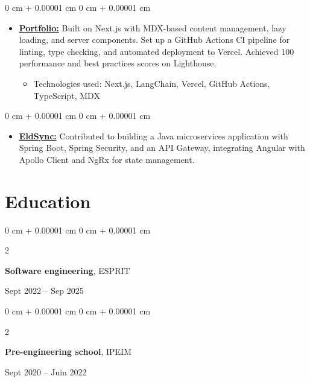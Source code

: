 \documentclass[10pt, letterpaper]{article}
\newenvironment{highlights}{
  \begin{itemize}[
    topsep=0.10 cm,
    parsep=0.10 cm,
    partopsep=0pt,
    itemsep=0pt,
    leftmargin=0 cm + 10pt
    ]
  }{
\end{itemize}
}
\newenvironment{highlightsforbulletentries}{
  \begin{itemize}[
    topsep=0 cm,
    parsep=0.10 cm,
    partopsep=0pt,
    itemsep=0pt,
    leftmargin=10pt
    ]
  }{
\end{itemize}
} %
\newenvironment{onecolentry}{
  \begin{adjustwidth}{
      0 cm + 0.00001 cm
    }{
      0 cm + 0.00001 cm
    }
  }{
  \end{adjustwidth}
} %
\newenvironment{twocolentry}[2][]{
  \onecolentry
  \def\secondColumn{#2}
  \setcolumnwidth{\fill, 4.5 cm}
  \begin{paracol}{2}
  }{
    \switchcolumn \raggedleft \secondColumn
  \end{paracol}
  \end{onecolentry}
} %
\begin{document}
\begin{onecolentry}
  \begin{highlights}
\item \textbf{\href{https://ihebbelhadj.vercel.app/}{Portfolio:}} Built on Next.js with MDX-based content management, lazy loading, and server components. Set up a GitHub Actions CI pipeline for linting, type checking, and automated deployment to Vercel. Achieved 100 performance and best practices scores on Lighthouse.
    \begin{highlightsforbulletentries}
    \item Technologies used: Next.js, LangChain, Vercel, GitHub Actions, TypeScript, MDX
    \end{highlightsforbulletentries}
  \end{highlights}
\end{onecolentry}

\begin{onecolentry}
  \begin{highlights}
  \item \textbf{\href{https://ihebbelhadj.vercel.app/projects/elder_care_saas}{EldSync:}} Contributed to building a Java microservices application with Spring Boot, Spring Security, and an API Gateway, integrating Angular with Apollo Client and NgRx for state management.
  \end{highlights}
\end{onecolentry}





  \section{Education}





  \begin{twocolentry}{
      Sept 2022 – Sep 2025
    }
    \textbf{Software engineering}, ESPRIT
  \end{twocolentry}

  \vspace{0.10 cm}

  \begin{twocolentry}{
      Sept 2020 – Juin 2022
    }
    \textbf{Pre-engineering school}, IPEIM
  \end{twocolentry}




  
\end{document}
